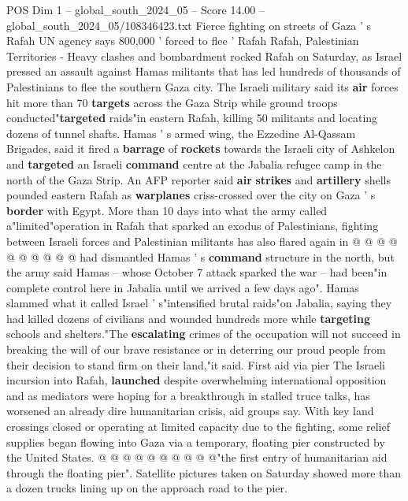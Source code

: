 \begin{textsample}{POS Dim 1 – global\_south\_2024\_05 – Score 14.00 – global\_south\_2024\_05/108346423.txt}  \label{ex:f1_pos_246}
Fierce fighting on streets of Gaza ' s Rafah UN agency says 800,000 ' forced to flee ' Rafah Rafah, Palestinian Territories - Heavy clashes and bombardment rocked Rafah on Saturday, as Israel pressed an assault against Hamas militants that has led hundreds of thousands of Palestinians to flee the southern Gaza city.
The Israeli military said its \textbf{air} forces hit more than 70 \textbf{targets} across the Gaza Strip while ground troops conducted"\textbf{targeted} raids"in eastern Rafah, killing 50 militants and locating dozens of tunnel shafts.
Hamas ' s armed wing, the Ezzedine Al-Qassam Brigades, said it fired a \textbf{barrage} of \textbf{rockets} towards the Israeli city of Ashkelon and \textbf{targeted} an Israeli \textbf{command} centre at the Jabalia refugee camp in the north of the Gaza Strip.
An AFP reporter said \textbf{air} \textbf{strikes} and \textbf{artillery} shells pounded eastern Rafah as \textbf{warplanes} criss-crossed over the city on Gaza ' s \textbf{border} with Egypt.
More than 10 days into what the army called a"limited"operation in Rafah that sparked an exodus of Palestinians, fighting between Israeli forces and Palestinian militants has also flared again in @ @ @ @ @ @ @ @ @ @ had dismantled Hamas ' s \textbf{command} structure in the north, but the army said Hamas -- whose October 7 attack sparked the war -- had been"in complete control here in Jabalia until we arrived a few days ago".
Hamas slammed what it called Israel ' s"intensified brutal raids"on Jabalia, saying they had killed dozens of civilians and wounded hundreds more while \textbf{targeting} schools and shelters."The \textbf{escalating} crimes of the occupation will not succeed in breaking the will of our brave resistance or in deterring our proud people from their decision to stand firm on their land,"it said.
First aid via pier The Israeli incursion into Rafah, \textbf{launched} despite overwhelming international opposition and as mediators were hoping for a breakthrough in stalled truce talks, has worsened an already dire humanitarian crisis, aid groups say.
With key land crossings closed or operating at limited capacity due to the fighting, some relief supplies began flowing into Gaza via a temporary, floating pier constructed by the United States. @ @ @ @ @ @ @ @ @ @"the first entry of humanitarian aid through the floating pier".
Satellite pictures taken on Saturday showed more than a dozen trucks lining up on the approach road to the pier.

\end{textsample}

